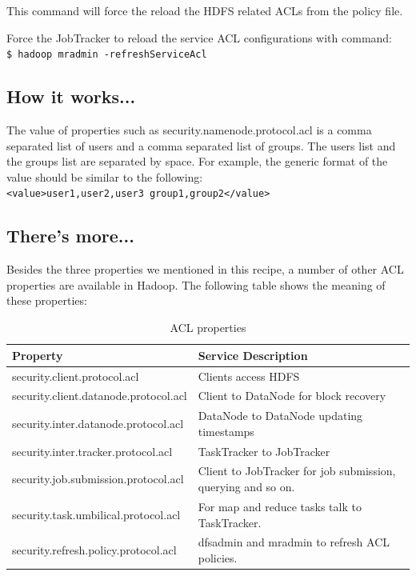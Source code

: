 This command will force the reload the HDFS related ACLs from the policy file.

Force the JobTracker to reload the service ACL configurations with command: \\
\verb|$ hadoop mradmin -refreshServiceAcl|

\subsection*{How it works...}
The value of properties such as security.namenode.protocol.acl is a comma separated list of users and a comma separated list of groups. The users list and the groups list are separated by space. For example, the generic format of the value should be similar to the following: \\
\verb|<value>user1,user2,user3 group1,group2</value>|

\subsection*{There's more...}
Besides the three properties we mentioned in this recipe, a number of other ACL properties are available in Hadoop. The following table shows the meaning of these properties: \\
\begin{table}
  \centering
  \small
  \begin{tabular}{ll}
    \toprule
    Property & Service Description \\ \midrule
    security.client.protocol.acl & Clients access HDFS \\
    security.client.datanode.protocol.acl & Client to DataNode for block recovery \\
    security.inter.datanode.protocol.acl & DataNode to DataNode updating timestamps \\
    security.inter.tracker.protocol.acl & TaskTracker to JobTracker \\
    security.job.submission.protocol.acl & Client to JobTracker for job submission, querying and so on. \\
    security.task.umbilical.protocol.acl & For map and reduce tasks talk to TaskTracker. \\
    security.refresh.policy.protocol.acl & dfsadmin and mradmin to refresh ACL policies. \\ \bottomrule
  \end{tabular}
  \caption{ACL properties}\label{tbl:acl}
\end{table}

